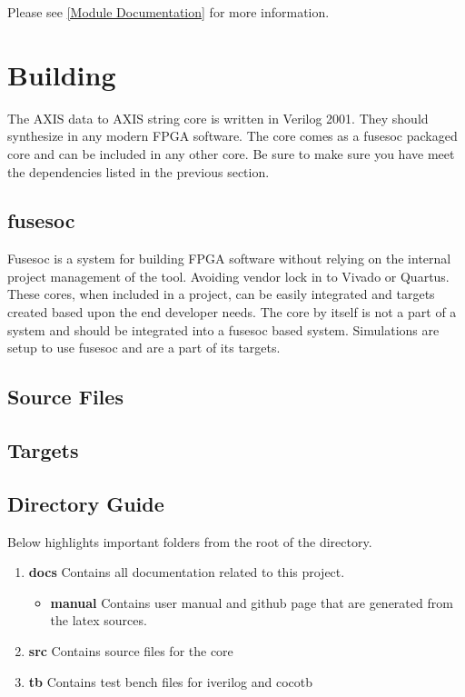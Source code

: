Please see \ref{Module Documentation} for more information.

\section{Building}

\par
The AXIS data to AXIS string core is written in Verilog 2001. They should synthesize in any modern FPGA software. The core comes as a fusesoc packaged core and can be
included in any other core. Be sure to make sure you have meet the dependencies listed in the previous section.

\subsection{fusesoc}
\par
Fusesoc is a system for building FPGA software without relying on the internal project management of the tool. Avoiding vendor lock in to Vivado or Quartus.
These cores, when included in a project, can be easily integrated and targets created based upon the end developer needs. The core by itself is not a part of
a system and should be integrated into a fusesoc based system. Simulations are setup to use fusesoc and are a part of its targets.

\subsection{Source Files}



\subsection{Targets}



\subsection{Directory Guide}

\par
Below highlights important folders from the root of the directory.

\begin{enumerate}
  \item \textbf{docs} Contains all documentation related to this project.
    \begin{itemize}
      \item \textbf{manual} Contains user manual and github page that are generated from the latex sources.
    \end{itemize}
  \item \textbf{src} Contains source files for the core
  \item \textbf{tb} Contains test bench files for iverilog and cocotb
\end{enumerate}

